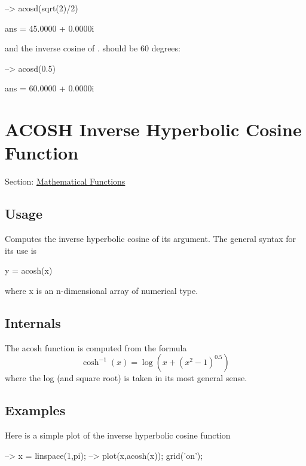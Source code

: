 \begin{DoxyVerbInclude}
--> acosd(sqrt(2)/2)

ans = 
  45.0000 +  0.0000i 
\end{DoxyVerbInclude}


and the inverse cosine of {.} should be 60 degrees\-:


\begin{DoxyVerbInclude}
--> acosd(0.5)

ans = 
  60.0000 +  0.0000i 
\end{DoxyVerbInclude}
 \hypertarget{mathfunctions_acosh}{}\section{A\-C\-O\-S\-H Inverse Hyperbolic Cosine Function}\label{mathfunctions_acosh}
Section\-: \hyperlink{sec_mathfunctions}{Mathematical Functions} \hypertarget{vtkwidgets_vtkxyplotwidget_Usage}{}\subsection{Usage}\label{vtkwidgets_vtkxyplotwidget_Usage}
Computes the inverse hyperbolic cosine of its argument. The general syntax for its use is \begin{DoxyVerb}  y = acosh(x)
\end{DoxyVerb}
 where {\ttfamily x} is an {\ttfamily n}-\/dimensional array of numerical type. \hypertarget{transforms_svd_Function}{}\subsection{Internals}\label{transforms_svd_Function}
The {\ttfamily acosh} function is computed from the formula \[ \cosh^{-1}(x) = \log\left(x + (x^2 - 1)^0.5\right) \] where the {\ttfamily log} (and square root) is taken in its most general sense. \hypertarget{variables_matrix_Examples}{}\subsection{Examples}\label{variables_matrix_Examples}
Here is a simple plot of the inverse hyperbolic cosine function


\begin{DoxyVerbInclude}
--> x = linspace(1,pi);
--> plot(x,acosh(x)); grid('on');
\end{DoxyVerbInclude}


